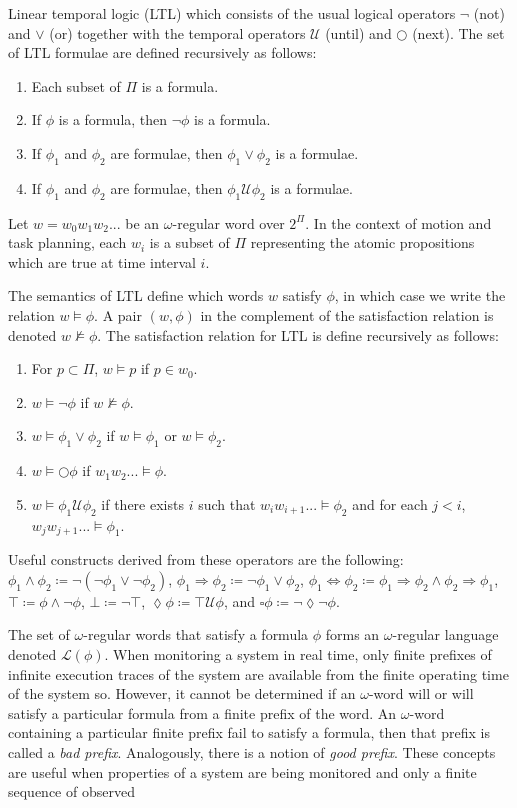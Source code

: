 \documentclass{llncs}
\begin{document}
Linear temporal logic (LTL) which consists of the usual logical operators $\neg$ (not) and $\vee$ (or) together with the temporal operators $\mathcal{U}$ (until) and $\bigcirc$ (next).
%
The set of LTL formulae are defined recursively as follows:
\begin{enumerate}
	\item Each subset of $\Pi$ is a formula.
	\item If $\phi$ is a formula, then $\neg\phi$ is a formula.
	\item If $\phi_1$ and $\phi_2$ are formulae, then $\phi_1 \vee \phi_2$ is a formulae.
	\item If $\phi_1$ and $\phi_2$ are formulae, then $\phi_1 \mathcal{U} \phi_2$ is a formulae.
\end{enumerate}
Let $w=w_0w_1w_2...$ be an $\omega$-regular word over $2^{\Pi}$. 
%
In the context of motion and task planning, each $w_i$ is a subset of $\Pi$ representing the atomic propositions which are true at time interval $i$.
%

The semantics of LTL define which words $w$ satisfy $\phi$, in which case we write the relation $w \models \phi$. 
%
A pair $(w,\phi)$ in the complement of the satisfaction relation is denoted $w\not\models\phi$.
%
The satisfaction relation for LTL is define recursively as follows:
\begin{enumerate}
	\item For $p\subset \Pi$,  $w\models p$ if $p \in w_0$.
	\item $w\models \neg\phi$ if $w \not\models \phi$.
	\item $w\models \phi_1 \vee \phi_2$ if $w\models\phi_1$ or $w\models\phi_2$.
	\item $w\models \bigcirc\phi$ if $w_1w_2... \models \phi$.
	\item $w\models \phi_1 \mathcal{U} \phi_2$ if there exists $i$ such that $w_iw_{i+1}...\models\phi_2$ and for each $j<i$, $w_jw_{j+1}...\models\phi_1$.
\end{enumerate}
%
Useful constructs derived from these operators are the following: $\phi_1 \wedge \phi_2 \coloneqq \neg(\neg \phi_1 \vee \neg \phi_2)$, $\phi_1 \Rightarrow \phi_2 \coloneqq \neg \phi_1 \vee \phi_2$, $\phi_1 \Leftrightarrow \phi_2 \coloneqq \phi_1 \Rightarrow \phi_2 \wedge \phi_2 \Rightarrow \phi_1$, $\top \coloneqq \phi \wedge \neg \phi$, $\bot \coloneqq \neg \top$, $\lozenge \phi \coloneqq \top \mathcal{U} \phi$, and $\square \phi \coloneqq \neg \lozenge\neg \phi$.
%

The set of $\omega$-regular words that satisfy a formula $\phi$ forms an $\omega$-regular language denoted $\mathcal{L}(\phi)$.
%
When monitoring a system in real time, only finite prefixes of infinite execution traces of the system are available from the finite operating time of the system so. 
%
However, it cannot be determined if an $\omega$-word will or will satisfy a particular formula from a finite prefix of the word. 
%
An $\omega$-word containing a particular finite prefix fail to satisfy a formula, then that prefix is called a \emph{bad prefix}. 
%
Analogously, there is a notion of \emph{good prefix}.
%
These concepts are useful when properties of a system are being monitored and only a finite sequence of observed   
\end{document}

